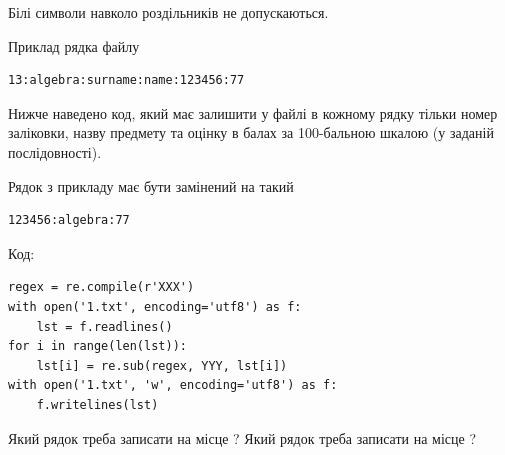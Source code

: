 \documentclass[12pt, ukrainian]{article}
\begin{document}
{Білі символи навколо роздільників не допускаються.

Приклад рядка файлу



\begin{verbatim}
13:algebra:surname:name:123456:77
\end{verbatim}


Нижче наведено код, який має залишити у файлі в кожному рядку тільки номер заліковки, назву предмету та оцінку в балах за 100-бальною шкалою (у заданій послі\-дов\-ності).

Рядок з прикладу має бути замінений на такий



\begin{verbatim}
123456:algebra:77
\end{verbatim}




Код:



\begin{verbatim}
regex = re.compile(r'XXX')
with open('1.txt', encoding='utf8') as f:
    lst = f.readlines()
for i in range(len(lst)):
    lst[i] = re.sub(regex, YYY, lst[i])
with open('1.txt', 'w', encoding='utf8') as f:
    f.writelines(lst)
\end{verbatim}





Який рядок треба записати на місце  ?
Який рядок треба записати на місце  ?\par

}
\newpage
\end{document}
